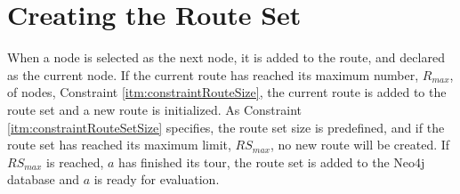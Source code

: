 \section{Creating the Route Set}
\label{sec:algoCreatingRouteSet}

When a node is selected as the next node, it is added to the route, and declared as the current node. If the current route has reached its maximum number, $R_{max}$, of nodes, Constraint \vref{itm:constraintRouteSize}, the current route is added to the route set and a new route is initialized. As Constraint \vref{itm:constraintRouteSetSize} specifies, the route set size is predefined, and if the route set has reached its maximum limit, $RS_{max}$, no new route will be created. If $RS_{max}$ is reached, $a$ has finished its tour, the route set is added to the Neo4j database and $a$ is ready for evaluation. 